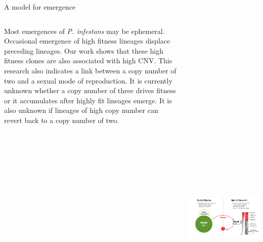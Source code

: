 
\begin{columns}[t]
  \begin{column}{0.71\textwidth}
    \begin{block}{\large A model for emergence}
      \begin{columns}
        \begin{column}{0.55\textwidth}
\footnotesize
Most emergences of \textit{P. infestans} may be ephemeral.
Occasional emergence of high fitness lineages displace preceding lineages.
Our work shows that these high fitness clones are also associated with high CNV.
This research also indicates a link between a copy number of two and a sexual mode of reproduction.
It is currently unknown whether a copy number of three drives fitness or it accumulates after highly fit lineages emerge.
It is also unknown if lineages of high copy number can revert back to a copy number of two.
        \end{column}
        \begin{column}{0.44\textwidth}
          \includegraphics[height=20cm]{./figures/Fig8_Model.pdf}
        \end{column}
      \end{columns}


\end{block}
\end{column}
\end{columns}
